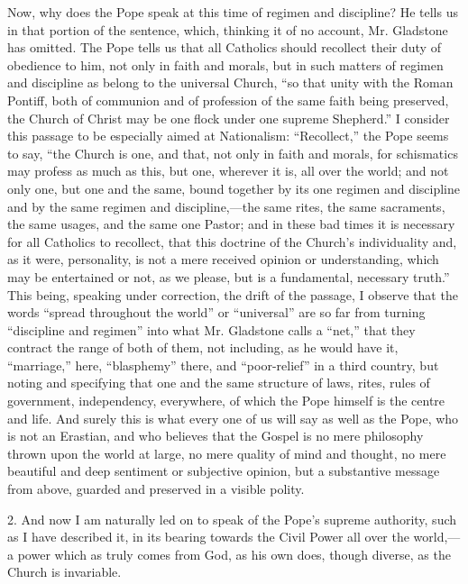 Now, why does the Pope speak at this time of regimen and discipline?
He tells us in that portion of the sentence, which, thinking it of no
account, Mr. Gladstone has omitted. The Pope tells us that all Catholics
should recollect their duty of obedience to him, not only in faith and
morals, but in such matters of regimen and discipline as belong to the
universal Church, ``so that unity with the Roman Pontiff, both of
communion and of profession of the same faith being preserved, the
Church of Christ may be one flock under one supreme
Shepherd.'' I consider this passage to be especially aimed at
Nationalism: ``Recollect,'' the Pope seems to say, ``the
Church is one, and that, not only in faith and morals, for schismatics
may profess as much as this, but one, wherever it is, all over the
world; and not only one, but one and the same, bound together by its one
regimen and discipline and by the same regimen and discipline,—the
same rites, the same sacraments, the same usages, and the same one
Pastor; and in these bad times it is necessary for all Catholics to
recollect, that this doctrine of the Church's individuality and, as it
were, personality, is not a mere received opinion or understanding,
which may be entertained or not, as we please, but is a fundamental,
necessary truth.'' This being, speaking under correction, the drift
of the passage, I observe that the words ``spread throughout the
world'' or ``universal'' are so far from turning
``discipline and regimen'' into what Mr. Gladstone calls a
``net,'' that they contract the range of both of them, not
including, as he would have it, ``marriage,'' here,
``blasphemy'' there, and ``poor-relief'' in a third
country, but noting and specifying that one and the same structure of
laws, rites, rules of government, independency, everywhere, of which the
Pope himself is the centre and life. And surely this is what every one
of us will say as well as the Pope, who is not an Erastian, and who
believes that the Gospel is no mere philosophy thrown upon the world at
large, no mere quality of mind and thought, no mere beautiful and deep
sentiment or subjective opinion, but a substantive message from above,
guarded and preserved in a visible polity.

2. And now I am naturally led on to speak of the Pope's supreme
authority, such as I have described it, in its bearing towards the Civil
Power all over the world,—a power which as truly comes from God, as
his own does, though diverse, as the Church is invariable.

